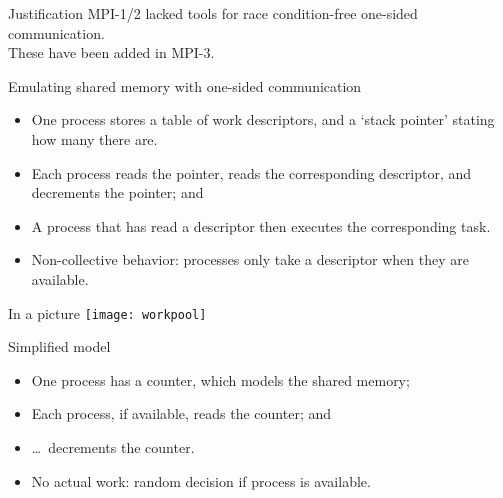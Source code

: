 
\begin{numberedframe}{Justification}
  MPI-1/2 lacked tools for race condition-free one-sided communication.\\
  These have been added in MPI-3.
\end{numberedframe}

\begin{numberedframe}{Emulating shared memory with one-sided communication}
  \begin{itemize}
  \item One process stores a table of work descriptors, and a `stack pointer'
    stating how many there are.
  \item Each process reads the pointer, reads the corresponding
    descriptor, and decrements the pointer; and
  \item A process that has read a descriptor then executes the
    corresponding task.
  \item Non-collective behavior: processes only take a descriptor when they are available.
  \end{itemize}
\end{numberedframe}

\begin{numberedframe}{In a picture}
  \texttt{[image: workpool]}
\end{numberedframe}

\begin{numberedframe}{Simplified model}
  \begin{itemize}
  \item One process has a counter, which models the shared memory;
  \item Each process, if available, reads the counter; and
  \item \ldots~decrements the counter.
  \item No actual work: random decision if process is available.
  \end{itemize}
\end{numberedframe}

